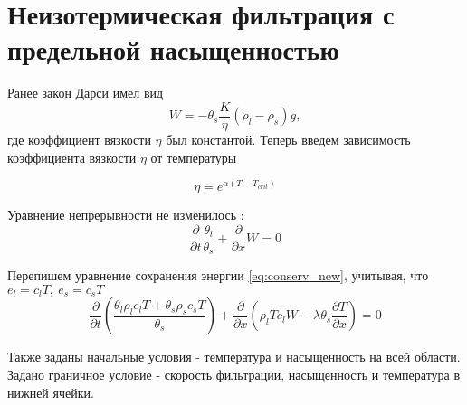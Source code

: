 \documentclass[12pt,a4paper]{article}
\newcommand{\pd}[2]{\frac{\partial #1}{\partial #2}}
\begin{document}
\newpage
\section{Неизотермическая фильтрация с предельной насыщенностью}

Ранее закон Дарси имел вид 
$$
W= -\theta_s \frac{K}{\eta}(\rho_l-\rho_s)g,
$$
где коэффициент вязкости $\eta $ был константой. Теперь введем зависимость коэффициента вязкости 	$ \eta $ от температуры

\begin{equation}
\eta = e^{\alpha(T - T_{crit})}
\label{viscos}
\end{equation}

Уравнение непрерывности не изменилось :
$$
\pd{}{t}\frac{\theta_l}{\theta_s} + \pd{}{x}W = 0
$$

Перепишем уравнение сохранения энергии \eqref{eq:conserv_new}, учитывая, что $ e_l = c_lT,\ e_s = c_sT $ 
\begin{equation}
\pd{}{t} \left(\frac{\theta_l \rho_l c_l T + \theta_s \rho_s c_s T}{\theta_s}\right) + \pd{}{x}\left(\rho_l T c_l W - \lambda \theta_s \pd{T}{x}\right) = 0
\label{conserv}
\end{equation}

Также заданы начальные условия -  температура и насыщенность на всей области. Задано граничное условие - скорость фильтрации, насыщенность и температура в нижней ячейки.
\end{document}
